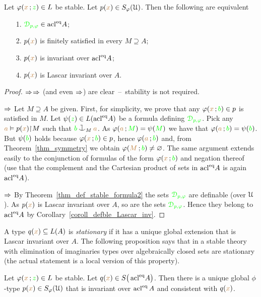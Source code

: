 \documentclass[creche.tex]{subfiles}
\begin{document}
\begin{proposition}\label{prop_type_over_acl2}
  Let $\varphi({\color{brown} x}\,;{\color{green} z})\in L$ be stable.
  Let $p({\color{brown} x})\in S_\varphi(\EuScript U)$. 
  Then the following are equivalent
  \begin{itemize}
  \item[1.] ${\color{green}\EuScript D_{p,\varphi}}\in \mathop{\rm acl}^{{\rm eq}}\!A$;
  \item[2.] $p({\color{brown} x})$ is finitely satisfied in every $M\supseteq A$;
  \item[3.] $p({\color{brown} x})$ is invariant over $\mathop{\rm acl}^{{\rm eq}}\!A$;
  \item[4.] $p({\color{brown} x})$ is Lascar invariant over $A$.
  \end{itemize}
\end{proposition}
\begin{proof}
  $\Rightarrow$$\Rightarrow$ (and even $\Rightarrow$) are clear~--~stability is not required.

  $\Rightarrow$
  Let $M\supseteq A$ be given.
  First, for simplicity, we prove that any $\varphi({\color{brown} x}\,;{\color{green} b})\in p$ is satisfied in $M$.
  Let $\psi({\color{green} z})\in L(\mathop{\rm acl}^{{\rm eq}}\!A)$ be a formula defining ${\color{green}\EuScript D_{p,\varphi}}$.
  Pick any ${\color{brown} a}\vDash p({\color{brown} x}){\restriction} M$ such that ${\gr b}\cnonfork_M{\mr a}$.
  As $\varphi({\color{brown} a}\,;{\color{green} M})=\psi({\color{green} M})$ we have that $\varphi({\color{brown} a}\,;{\color{green} b})=\psi({\color{green} b})$.
  But $\psi({\color{green} b})$ holds because $\varphi({\color{brown} x}\,;{\color{green} b})\in p$, hence $\varphi({\color{brown} a}\,;{\color{green} b})$ and, from Theorem~\ref{thm_symmetry} we obtain $\varphi({\color{brown} M}\,;{\color{green} b})\neq\varnothing$.
  The same argument extends easily to the conjunction of formulas of the form $\varphi({\color{brown} x}\,;{\color{green} b})$ and negation thereof (use that the complement and the Cartesian product of sets in $\mathop{\rm acl}^{{\rm eq}}\!A$ is again $\mathop{\rm acl}^{{\rm eq}}\!A$).
 
  $\Rightarrow$ By Theorem~\ref{thm_def_stable_formula2} the sets ${\color{green}\EuScript D_{p,\varphi}}$ are definable (over $\EuScript U$).
  As $p({\color{brown} x})$ is Lascar invariant over $A$, so are the sets ${\color{green}\EuScript D_{p,\varphi}}$.
  Hence they belong to $\mathop{\rm acl}^{{\rm eq}}\!A$ by Corollary~\ref{coroll_defble_Lascar_inv}.
\end{proof}

A type $q({\color{brown} x})\subseteq L(A)$ is \emph{stationary\/} if it has a unique global extension that is Lascar invariant over $A$.
The following proposition says that in a stable theory with elimination of imaginaries types over algebraically closed sets are stationary (the actual statement is a local version of this property).

\begin{theorem}[ (Stationarity)]\label{thm_stationarity}
  Let $\varphi({\color{brown} x}\,;{\color{green} z})\in L$ be stable.
  Let $q({\color{brown} x})\in S\big(\mathop{\rm acl}^{{\rm eq}}\!A\big)$.
  Then there is a unique global $\phi$-type $p({\color{brown} x})\in S_\varphi(\EuScript U)$ that is invariant over $\mathop{\rm acl}^{{\rm eq}} A$ and consistent with $q({\color{brown} x})$.
\end{theorem}
\end{document}

